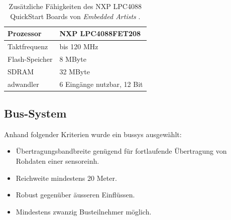 \begin{table}
\begin{center}
\begin{tabular}{|l|l|}
\hline
Prozessor & NXP LPC4088FET208\\
\hline
Taktfrequenz & bis 120 MHz \\
\hline
Flash-Speicher & 8 MByte \\
\hline
SDRAM & 32 MByte \\
\hline
\gls{adwandler} & 6 Eingänge nutzbar, 12 Bit \\
\hline
\end{tabular}
\caption{Zusätzliche Fähigkeiten des NXP LPC4088 QuickStart Boards von \emph{Embedded Artists}  \cite{nxplpc4088qsb}.}
\label{table.lpc4088qsb}
\end{center}
\end{table}

\subsection{Bus-System}
Anhand folgender Kriterien wurde ein \gls{bussys} ausgewählt:

\begin{itemize}
\item Übertragungsbandbreite genügend für fortlaufende Übertragung von Rohdaten einer \gls{sensoreinh}.
\item Reichweite mindestens 20 Meter.
\item Robust gegenüber äusseren Einflüssen.
\item Mindestens zwanzig Busteilnehmer möglich.
\end{itemize}

